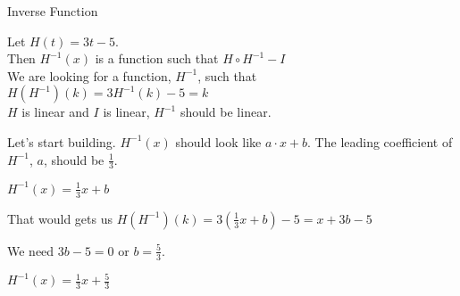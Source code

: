 \documentclass{ximera}
\begin{document}
\begin{example} Inverse Function


Let $H(t) = 3t - 5$. \\

Then $H^{-1}(x)$ is a function such that $H \circ H^{-1} - I$ \\


We are looking for a function, $H^{-1}$, such that $H(H^{-1})(k) = 3 H^{-1}(k) - 5 = k$ \\



$H$ is linear and $I$ is linear, $H^{-1}$ should be linear.

Let's start building.  $H^{-1}(x)$ should look like $a \cdot x + b$.  The leading coefficient of $H^{-1}$, $a$, should be $\frac{1}{3}$.


$H^{-1}(x) =\frac{1}{3} x + b$


That would gets us $H(H^{-1})(k) = 3 (\frac{1}{3}x + b) - 5 = x + 3b - 5 $


We need $3b - 5 = 0$ or $b = \frac{5}{3}$.


$H^{-1}(x) =\frac{1}{3} x + \frac{5}{3}$



\end{example}
\end{document}
